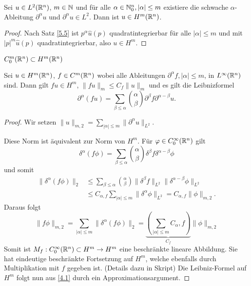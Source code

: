 \documentclass{mycourse}
\begin{document}
\begin{st}\label{5.6}
Sei $u\in L^2(\mathbb{R}^n)$, $m\in \mathbb{N}$ und für alle $\alpha\in \mathbb{N}_0^n, |\alpha|\le m$ existiere die schwache $\alpha$-Ableitung $\partial^\alpha u$ und $\partial^\alpha u\in L^2$. Dann ist $u\in H^m(\mathbb{R}^n)$.  
\end{st}
\begin{proof}
Nach Satz \ref{5.5} ist $p^\alpha \hat u(p)$ quadratintegrierbar für alle $|\alpha|\le m$ und mit $|p|^m \hat u(p)$ quadratintegrierbar, also $u\in H^m$.
\end{proof}

\begin{kor}\label{5.7}
$C_0^m(\mathbb{R}^n) \subset H^m(\mathbb{R}^n)$
\end{kor}

\begin{st}\label{5.8}
Sei $u\in H^m(\mathbb{R}^n)$, $f\in C^m(\mathbb{R}^n)$ wobei alle Ableitungen $\partial^\alpha f, |\alpha| \le m$, in $L^\infty(\mathbb{R}^n)$ sind. Dann gilt $fu \in H^m$,
$\|fu\|_m\le C_f \| u\|_m$ und es gilt die Leibnizformel
\[
\partial^\alpha(fu)=\sum_{\beta \le \alpha} \binom{\alpha}{\beta} \partial^\beta f \partial^{\alpha- \beta} u.
\]
\end{st}
\begin{proof}
Wir setzen $\| u \|_{m,2}=\sum_{|\alpha| \le m} \| \partial^\alpha u\|_{L^2}$.

Diese Norm ist äquivalent zur Norm von $H^m$. Für $\varphi \in C_0^\infty(\mathbb{R}^n)$ gilt
\begin{equation}\label{4.1}
\delta^\alpha(f\phi) = \sum_{\beta \le \alpha} \binom{\alpha}{\beta} \delta^\beta f \delta^{\alpha-\beta} \phi
\end{equation}
und somit
\begin{align*}
\|\delta^\alpha(f\phi) \|_2 &\le \sum_{\beta \le \alpha} \binom{\alpha}{\beta} \| \delta^\beta f\| _{L^2} \| \delta^{\alpha-\beta} \phi \|_{L^2}\\
&\le C_{\alpha,f} \sum_{|\alpha|\le m} \| \delta^\alpha \phi \|_{L^2}= C_{\alpha,f} \| \phi \|_{m,2}.
\end{align*}
Daraus folgt
\[
\|f\phi\|_{m,2}= \sum_{|\alpha|\le m} \| \delta^\alpha(f\phi)\|_2=\underbrace{\left (\sum_{|\alpha|\le m} C_\alpha,f\right) }_{C_f}  \|\phi\|_{m,2}
\]
Somit ist $M_f:C_0^\infty (\mathbb{R}^n) \subset H^m \to H^m$ eine beschränkte lineare Abbildung. Sie hat eindeutige beschränkte Fortsetzung auf $H^m$, welche ebenfalls durch  Multiplikation mit $f$ gegeben ist. (Details dazu in Skript) Die Leibniz-Formel auf $H^m$ folgt nun aus \eqref{4.1} durch ein Approximationsargument.
\end{proof}
\end{document}
